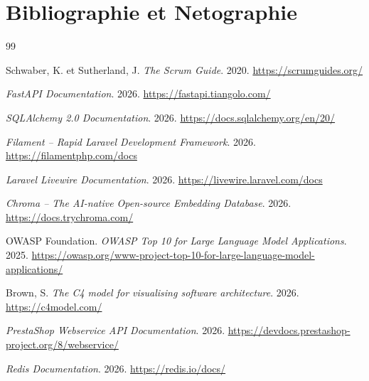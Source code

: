 \chapter*{Bibliographie et Netographie}

\begin{thebibliography}{99}

Schwaber, K. et Sutherland, J. \emph{The Scrum Guide}. 2020.
\url{https://scrumguides.org/}

\emph{FastAPI Documentation}. 2026.
\url{https://fastapi.tiangolo.com/}

\emph{SQLAlchemy 2.0 Documentation}. 2026.
\url{https://docs.sqlalchemy.org/en/20/}

\emph{Filament -- Rapid Laravel Development Framework}. 2026.
\url{https://filamentphp.com/docs}

\emph{Laravel Livewire Documentation}. 2026.
\url{https://livewire.laravel.com/docs}

\emph{Chroma -- The AI-native Open-source Embedding Database}. 2026.
\url{https://docs.trychroma.com/}

OWASP Foundation. \emph{OWASP Top 10 for Large Language Model Applications}. 2025.
\url{https://owasp.org/www-project-top-10-for-large-language-model-applications/}

Brown, S. \emph{The C4 model for visualising software architecture}. 2026.
\url{https://c4model.com/}

\emph{PrestaShop Webservice API Documentation}. 2026.
\url{https://devdocs.prestashop-project.org/8/webservice/}

\emph{Redis Documentation}. 2026.
\url{https://redis.io/docs/}

\end{thebibliography}
